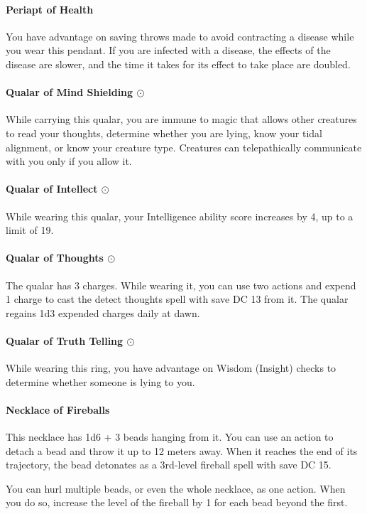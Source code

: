    \paragraph{Periapt of Health}
        You have advantage on saving throws made to avoid contracting a disease while you wear this pendant.
        If you are infected with a disease, the effects of the disease are slower, and the time it takes for its effect to take place are doubled.
    \paragraph{Qualar of Mind Shielding $\odot$}
        While carrying this qualar, you are immune to magic that allows other creatures to read your thoughts, determine whether you are lying, know your tidal alignment, or know your creature type.
        Creatures can telepathically communicate with you only if you allow it.
    \paragraph{Qualar of Intellect $\odot$}
        While wearing this qualar, your Intelligence ability score increases by 4, up to a limit of 19.
    \paragraph{Qualar of Thoughts $\odot$}
        The qualar has 3 charges.
        While wearing it, you can use two actions and expend 1 charge to cast the detect thoughts spell with save DC 13 from it.
        The qualar regains 1d3 expended charges daily at dawn.
    \paragraph{Qualar of Truth Telling $\odot$}
        While wearing this ring, you have advantage on Wisdom (Insight) checks to determine whether someone is lying to you.
    \paragraph{Necklace of Fireballs}
        This necklace has 1d6 + 3 beads hanging from it. You can use an action to detach a bead and throw it up to 12 meters away.
        When it reaches the end of its trajectory, the bead detonates as a 3rd-level fireball spell with save DC 15.

        You can hurl multiple beads, or even the whole necklace, as one action.
        When you do so, increase the level of the fireball by 1 for each bead beyond the first.
